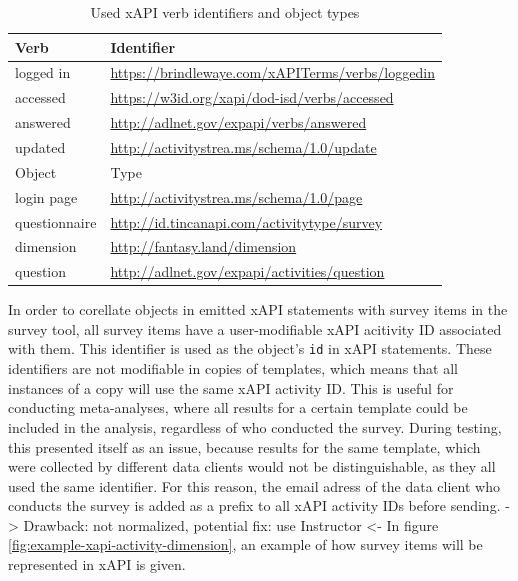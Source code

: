 \documentclass[a4paper,11pt]{article}
\def\inline{\lstinline[basicstyle=\ttfamily,keywordstyle={}]}
\begin{document}
                \begin{table}
                    \begin{tabularx}{\textwidth}{|l|X|}
                        \hline
                        Verb & Identifier \\
                        \hline 
                        logged in & \url{https://brindlewaye.com/xAPITerms/verbs/loggedin} \\
                        accessed & \url{https://w3id.org/xapi/dod-isd/verbs/accessed}\\
                        answered & \url{http://adlnet.gov/expapi/verbs/answered}\\
                        updated & \url{http://activitystrea.ms/schema/1.0/update}\\
                        \hline \hline
                        Object & Type \\
                        \hline
                        login page & \url{http://activitystrea.ms/schema/1.0/page}\\
                        questionnaire & \url{http://id.tincanapi.com/activitytype/survey}\\
                        dimension & \url{http://fantasy.land/dimension}\\
                        question & \url{http://adlnet.gov/expapi/activities/question} \\
                        \hline
                    \end{tabularx}
                    \caption{Used xAPI verb identifiers and object types}
                    \label{table:xapi-identifiers-used}
                \end{table}

                In order to corellate objects in emitted xAPI statements with survey
                items in the survey tool, all survey items have a user-modifiable
                xAPI acitivity ID associated with them. This identifier is
                used as the object's \inline{id} in xAPI statements.
                These identifiers are not modifiable in copies of templates,
                which means that all instances of a copy will use the same xAPI
                activity ID. This is useful for conducting meta-analyses, where
                all results for a certain template could be included in the analysis,
                regardless of who conducted the survey. During testing, this
                presented itself as an issue, because results for the same template,
                which were collected by different data clients would not be distinguishable,
                as they all used the same identifier. For this reason,
                the email adress of the data client who conducts the survey
                is added as a prefix to all xAPI activity IDs before sending.
                -> Drawback: not normalized, potential fix: use Instructor <-
                In figure \ref{fig:example-xapi-activity-dimension}, an example
                of how survey items will be represented in xAPI is given. 
\end{document}
